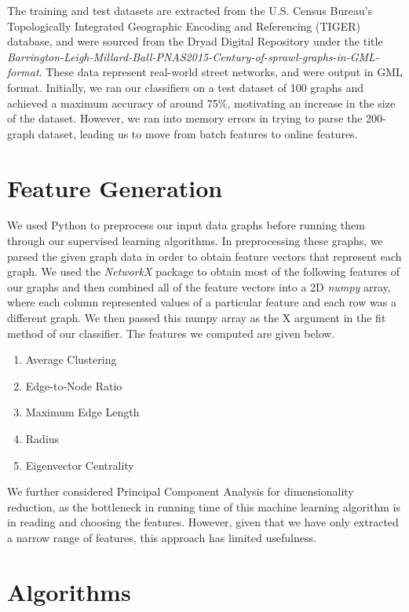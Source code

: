 \documentclass{article}
\begin{document}
The training and test datasets are extracted from the U.S. Census Bureau's Topologically Integrated Geographic Encoding and Referencing (TIGER) database, and were sourced from the Dryad Digital Repository under the title \textit{Barrington-Leigh-Millard-Ball-PNAS2015-Century-of-sprawl-graphs-in-GML-format}. These data represent real-world street networks, and were output in GML format. Initially, we ran our classifiers on a test dataset of 100 graphs and achieved a maximum accuracy of around 75$\%$, motivating an increase in the size of the dataset. However, we ran into memory errors in trying to parse the 200-graph dataset, leading us to move from batch features to online features.

\section{Feature Generation}

We used Python to preprocess our input data graphs before running them through our supervised learning algorithms. In preprocessing these graphs, we parsed the given graph data in order to obtain feature vectors that represent each graph. We used the \textit{NetworkX} package to obtain most of the following features of our graphs and then combined all of the feature vectors into a 2D \textit{numpy} array, where each column represented values of a particular feature and each row was a different graph. We then passed this numpy array as the X argument in the fit method of our classifier. The features we computed are given below.

\begin{enumerate}
\item Average Clustering
\item Edge-to-Node Ratio
\item Maximum Edge Length
\item Radius
\item Eigenvector Centrality
\end{enumerate}

We further considered Principal Component Analysis for dimensionality reduction, as the bottleneck in running time of this machine learning algorithm is in reading and choosing the features. However, given that we have only extracted a narrow range of features, this approach has limited usefulness.

\section{Algorithms}
\end{document}

